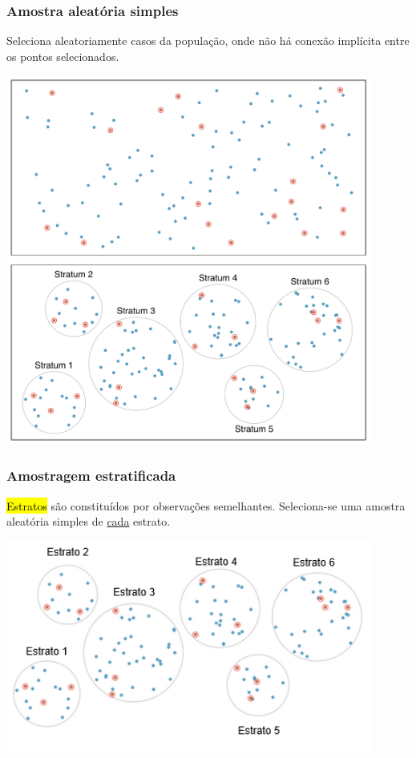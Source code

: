 
\begin{frame}
\frametitle{Amostra aleatória simples}
\justifying
Seleciona aleatoriamente casos da população, onde não há conexão implícita entre os pontos selecionados.

\begin{center}
\includegraphics[width=0.9\textwidth]{1-4_obs_studies_sampling/simple.pdf}
\end{center}

\end{frame}


\begin{frame}
\frametitle{Amostragem estratificada}
\justifying
\hl{Estratos} são constituídos por observações semelhantes. Seleciona-se uma amostra aleatória simples de \underline{cada} estrato.

\begin{center}
\includegraphics[width=0.9\textwidth]{1-4_obs_studies_sampling/stratified.png}
\end{center}

\end{frame}

